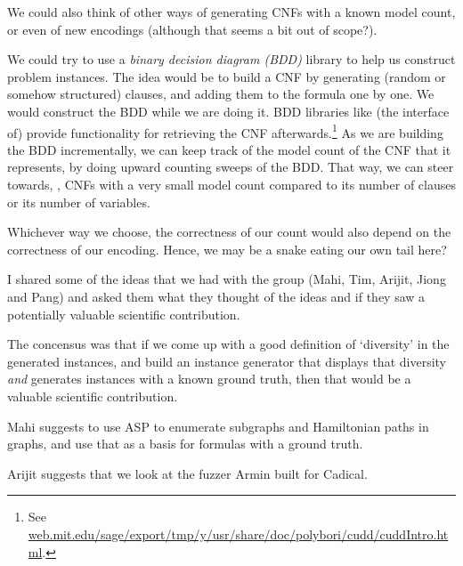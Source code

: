 \documentclass[a4paper]{tufte-handout}
\begin{document}
	We could also think of other ways of generating CNFs with a known model count, or even of new encodings (although that seems a bit out of scope?).
	
	\noindent\hrulefill
	
	
	
	We could try to use a {\em binary decision diagram (BDD)} library to help us construct problem instances.
	The idea would be to build a CNF by generating (random or somehow structured) clauses, and adding them to the formula one by one.
	We would construct the BDD while we are doing it.
	BDD libraries like (the \python{} interface of) \cudd{} provide functionality for retrieving the CNF afterwards.\footnote{See \href{http://web.mit.edu/sage/export/tmp/y/usr/share/doc/polybori/cudd/cuddIntro.html}{web.mit.edu/sage/export/tmp/y/usr/share/doc/polybori/cudd/cuddIntro.html}.}
	As we are building the BDD incrementally, we can keep track of the model count of the CNF that it represents, by doing upward counting sweeps of the BDD.
	That way, we can steer towards, \eg{}, CNFs with a very small model count compared to its number of clauses or its number of variables.
	
	Whichever way we choose, the correctness of our count would also depend on the correctness of our encoding.
	Hence, we may be a snake eating our own tail here?
	
	\noindent\hrulefill
	
	
	
	I shared some of the ideas that we had with the group (Mahi, Tim, Arijit, Jiong and Pang) and asked them what they thought of the ideas and if they saw a potentially valuable scientific contribution.
	
	The concensus was that if we come up with a good definition of `diversity' in the generated instances, and build an instance generator that displays that diversity {\em and} generates instances with a known ground truth, then that would be a valuable scientific contribution.
	
	Mahi suggests to use ASP to enumerate subgraphs and Hamiltonian paths in graphs, and use that as a basis for formulas with a ground truth.
	
	Arijit suggests that we look at the fuzzer Armin built for Cadical.
	
\end{document}
